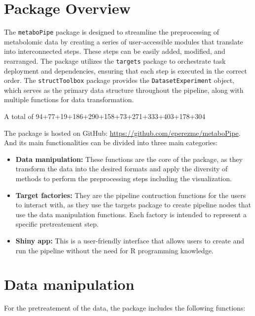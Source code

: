 \documentclass[ENG, BIB]{TFUOC}%
\begin{document}
\section{Package Overview}
The \texttt{metaboPipe} package is designed to streamline the preprocessing of metabolomic data by creating a series of user-accessible modules that translate into interconnected steps. These steps can be easily added, modified, and rearranged. The package utilizes the \texttt{targets} package to orchestrate task deployment and dependencies, ensuring that each step is executed in the correct order. The \texttt{structToolbox} package provides the \texttt{DatasetExperiment} object, which serves as the primary data structure throughout the pipeline, along with multiple functions for data transformation.

A total of 94+77+19+186+290+158+73+271+333+403+178+304

The package is hosted on GitHub: \url{https://github.com/eperezme/metaboPipe}. And its main functionalities can be divided into three main categories:
\begin{itemize}
    \item \textbf{Data manipulation:} These functions are the core of the package, as they transform the data into the desired formats and apply the diversity of methods to perform the preprocessing steps including the visualization.
    \item \textbf{Target factories:} They are the pipeline contruction functions for the users to interact with, as they use the targets package to create pipeline nodes that use the data manipulation functions. Each factory is intended to represent a specific pretreatement step.
    \item \textbf{Shiny app:} This is a user-friendly interface that allows users to create and run the pipeline without the need for R programming knowledge.
\end{itemize}

\section{Data manipulation}
For the pretreatement of the data, the package includes the following functions:
\end{document}
